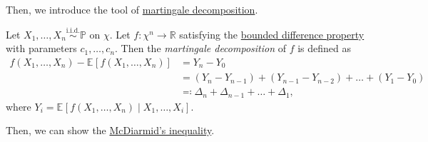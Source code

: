 Then, we introduce the tool of \hyperref[def:martingale-decomposition]{martingale decomposition}.

\begin{definition}\label{def:martingale-decomposition}
	Let \(X_1, \dots , X_n \overset{\text{i.i.d.} }{\sim } \mathbb{P}\) on \(\chi \). Let \(f \colon \chi ^n \to \mathbb{R} \) satisfying the \hyperref[def:bounded-difference-property]{bounded difference property} with parameters \(c_1, \dots , c_n\). Then the \emph{martingale decomposition} of \(f\) is defined as
	\[
		\begin{split}
			f(X_1, \dots , X_n) - \mathbb{E}_{}\left[f(X_1, \dots , X_n) \right]
			&= Y_n - Y_0 \\
			&= (Y_n - Y_{n-1}) + (Y_{n-1} - Y_{n-2}) + \dots + (Y_1 - Y_0) \\
			&\eqqcolon \Delta _n + \Delta _{n-1} + \dots + \Delta _1,
		\end{split}
	\]
	where \(Y_i = \mathbb{E}_{}\left[f(X_1, \dots , X_n) \mid X_1, \dots , X_i \right] \).
\end{definition}

Then, we can show the \hyperref[thm:McDiarmid-inequality]{McDiarmid's inequality}.


